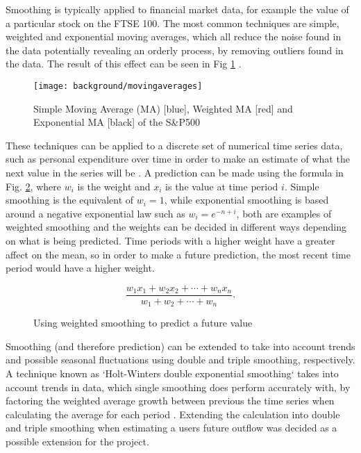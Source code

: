 Smoothing is typically applied to financial market data, for example the value of a particular stock on the FTSE 100. The most common techniques are simple, weighted and exponential moving averages, which all reduce the noise found in the data potentially revealing an orderly process, by removing outliers found in the data. The result of this effect can be seen in Fig \ref{fig:dashweightedaverages} \parencite{dash2012movingaverages}.

\begin{figure}[h]
    \centering
    \texttt{[image: background/movingaverages]}
    \caption[SMA, WMA and EMA of the S\&P500]{Simple Moving Average (MA) [blue], Weighted MA [red] and Exponential MA [black] of the S\&P500\protect\footnotemark  \parencite[Fig. 5]{dash2012movingaverages}}
    \label{fig:dashweightedaverages}
\end{figure}

These techniques can be applied to a discrete set of numerical time series data, such as personal expenditure over time in order to make an estimate of what the next value in the series will be \parencite{filliben2003nist}. A prediction can be made using the formula in Fig. \ref{fig:weightedmeanforumla}, where $w_{i}$ is the weight and $x_i$ is the value at time period $i$. Simple smoothing is the equivalent of $w_i = 1$, while exponential smoothing is based around a negative exponential law such as $w_i = e^{-n+i}$, both are examples of weighted smoothing and the weights can be decided in different ways depending on what is being predicted. Time periods with a higher weight have a greater affect on the mean, so in order to make a future prediction, the most recent time period would have a higher weight.  

\begin{figure}[h]
    \centering
    \[
        \frac{w_1 x_1 + w_2 x_2 + \cdots + w_n x_n}{w_1 + w_2 + \cdots + w_n}.
    \]
    \caption{Using weighted smoothing to predict a future value}
    \label{fig:weightedmeanforumla}
\end{figure}

Smoothing (and therefore prediction) can be extended to take into account trends and possible seasonal fluctuations using double and triple smoothing, respectively. A technique known as `Holt-Winters double exponential smoothing` takes into account trends in data, which single smoothing does perform accurately with, by factoring the weighted average growth between previous the time series when calculating the average for each period \parencite{kalekar2004holtwinters}.  
% 
Extending the calculation into double and triple smoothing when estimating a users future outflow was decided as a possible extension for the project.  


